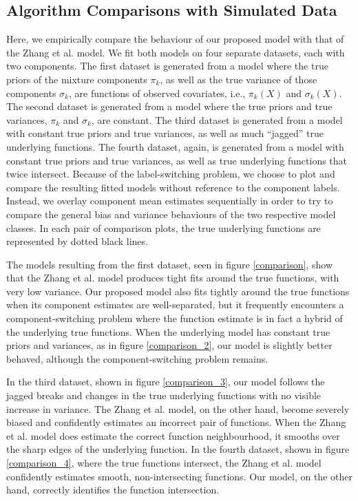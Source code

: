 \documentclass[10pt]{olplainarticle}\usepackage[]{graphicx}\usepackage[]{color}
\begin{document}
\subsection{Algorithm Comparisons with Simulated Data}

Here, we empirically compare the behaviour of our proposed model with that of the Zhang et al. model. We fit both models on four separate datasets, each with two components. The first dataset is generated from a model where the true priors of the mixture components $\pi_k$, as well as the true variance of those components $\sigma_k$, are functions of observed covariates, i.e., $\pi_k(X)$ and $\sigma_k(X)$. The second dataset is generated from a model where the true priors and true variances, $\pi_k$ and $\sigma_k$, are constant. The third dataset is generated from a model with constant true priors and true variances, as well as much ``jagged'' true underlying functions. The fourth dataset, again, is generated from a model with constant true priors and true variances, as well as true underlying functions that twice intersect. Because of the label-switching problem, we choose to plot and compare the resulting fitted models without reference to the component labels. Instead, we overlay component mean estimates sequentially in order to try to compare the general bias and variance behaviours of the two respective model classes. In each pair of comparison plots, the true underlying functions are represented by dotted black lines.

The models resulting from the first dataset, seen in figure \ref{comparison}, show that the Zhang et al. model produces tight fits around the true functions, with very low variance. Our proposed model also fits tightly around the true functions when its component estimates are well-separated, but it frequently encounters a component-switching problem where the function estimate is in fact a hybrid of the underlying true functions. When the underlying model has constant true priors and variances, as in figure \ref{comparison_2}, our model is slightly better behaved, although the component-switching problem remains.

In the third dataset, shown in figure \ref{comparison_3}, our model follows the jagged breaks and changes in the true underlying functions with no visible increase in variance. The Zhang et al. model, on the other hand, become severely biased and confidently estimates an incorrect pair of functions. When the Zhang et al. model does estimate the correct function neighbourhood, it smooths over the sharp edges of the underlying function. In the fourth dataset, shown in figure \ref{comparison_4}, where the true functions intersect, the Zhang et al. model confidently estimates smooth, non-intersecting functions. Our model, on the other hand, correctly identifies the function intersection.
\end{document}
